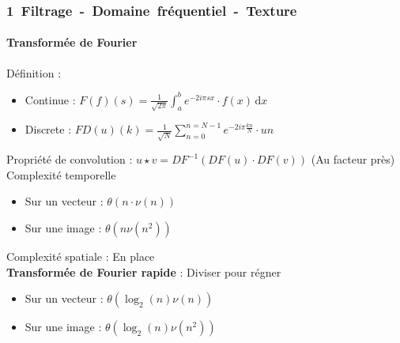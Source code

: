 \documentclass[french]{beamer}
\begin{document}
\begin{frame}
	\frametitle{\mbox{1 Filtrage - Domaine fréquentiel - Texture}}
	\framesubtitle{Transformée de Fourier}
	Définition :
	\begin{itemize}
		\item Continue :\; $F(f)(s) = \frac{1}{\sqrt{2\pi}} \int_a^b e^{- 2i\pi sx} \cdot f(x) \, \mathrm dx$ \\
		\item Discrete :\; $FD(u)(k) = \frac{1}{\sqrt{N}} \sum\limits_{n = 0}^{n = N - 1} e^{-2i\pi \frac{kn}{N}} \cdot u{n}$
	\end{itemize}
	\medskip
	Propriété de convolution : $u \star v = DF^{-1}(DF(u) \cdot DF(v))$ (Au facteur près)\\
	\medskip
	Complexité temporelle
	\begin{itemize}
		\item Sur un vecteur : $\theta(n \cdot \nu(n))$
		\item Sur une image : $\theta(n \nu(n^2))$
	\end{itemize}
	\medskip
	Complexité spatiale : En place \\
	\medskip
	\textbf{Transformée de Fourier rapide} : Diviser pour régner
	\begin{itemize}
		\item Sur un vecteur : $\theta(\log_2(n)\nu(n))$
		\item Sur une image : $\theta(\log_2(n)\nu(n^2))$
	\end{itemize}
\end{frame}
\end{document}
